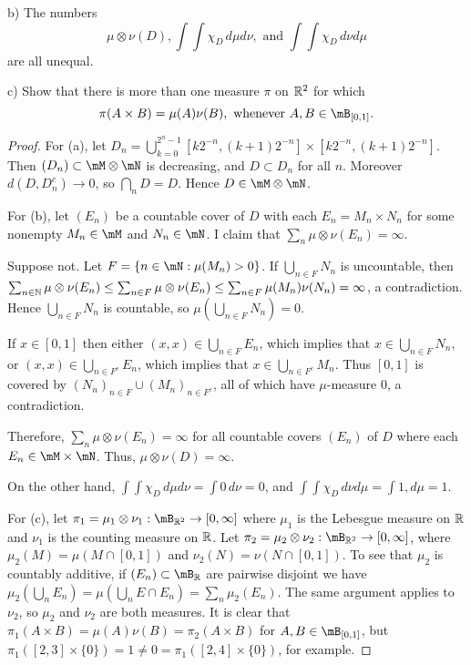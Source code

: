 \documentclass{article}
\begin{document}
b) The numbers 
$$\mu \otimes \nu (D), \int \int \chi_D \, d\mu d\nu, \text{ and } \int \int \chi_D \, d\nu d\mu$$
are all unequal.

c) Show that there is more than one measure $\pi$ on $\mathbb{R}^2$ for which
$$ \pi(A \times B) = \mu(A) \nu(B), \text{ whenever } A, B \in \mB_{[0,1]}.$$

\begin{proof}
For (a), let $D_n = \bigcup_{k=0}^{2^n-1} [k 2^{-n}, (k+1) 2^{-n}] \times [k 2^{-n}, (k+1) 2^{-n}]$.  Then $(D_n) \subset \mM \otimes \mN$ is decreasing, and $D \subset D_n$ for all $n$.  Moreover $d(D, D_n^c) \to 0$, so $\bigcap_n D = D$. Hence $D \in \mM \otimes \mN$.

For (b), let $(E_n)$ be a countable cover of $D$ with each $E_n = M_n \times N_n$ for some  nonempty $M_n \in \mM$ and $N_n \in \mN$.  I claim that $\sum_n \mu \otimes \nu(E_n) = \infty$. 

Suppose not. Let $F = \{ n \in \mN : \mu(M_n) > 0\}$. If $\bigcup_{n \in F} N_n$ is uncountable, then $\sum_{n \in \mathbb{N}} \mu \otimes \nu(E_n) \le \sum_{n \in F} \mu \otimes \nu(E_n) \le \sum_{n \in F} \mu(M_n) \nu(N_n) = \infty$, a contradiction. Hence $\bigcup_{n \in F} N_n$ is countable, so $\mu \left( \bigcup_{n \in F} N_n \right) = 0$.

If $x \in [0,1]$ then either $(x,x) \in \bigcup_{n \in F} E_n$, which implies that $x \in \bigcup_{n \in F} N_n$,  or $(x,x) \in \bigcup_{n \in F^c} E_n$, which implies that $x \in \bigcup_{n \in F^c} M_n$.  Thus $[0,1]$ is covered by $(N_n)_{n\in F} \cup (M_n)_{n \in F^c}$, all of which have $\mu$-measure $0$, a contradiction.

Therefore, $\sum_n \mu \otimes \nu(E_n) = \infty$ for all countable covers $(E_n)$ of $D$ where each $E_n \in \mM \times \mN$.  Thus, $\mu \otimes \nu(D) = \infty$.

On the other hand, $\int \int \chi_D  \, d \mu d\nu = \int 0 \, d \nu = 0$, and $\int \int \chi_D \, d \nu d \mu = \int 1 , d \mu  = 1$.

For (c), let $\pi_1 = \mu_1 \otimes \nu_1 :\mB_{\R^2} \to [0, \infty]$ where $\mu_1$ is the Lebesgue measure on $\mathbb{R}$ and $\nu_1$ is the counting measure on $\mathbb{R}$.  Let $\pi_2 = \mu_2 \otimes \nu_2:  \mB_{\R^2} \to [0, \infty]$, where $\mu_2(M) = \mu(M \cap [0,1])$ and $\nu_2(N) = \nu(N \cap [0,1])$. To see that $\mu_2$ is countably additive, if $(E_n) \subset \mB_\R$ are pairwise disjoint we have $\mu_2(\bigcup_n E_n) = \mu(\bigcup_n E \cap E_n) = \sum_n \mu_2(E_n)$.  The same argument applies to $\nu_2$, so $\mu_2$ and $\nu_2$ are both measures.   It is clear that $\pi_1(A \times B) = \mu(A) \nu(B) = \pi_2(A \times B)$ for $A,B \in \mB_{[0,1]}$, but $\pi_1([2,3] \times \{0\}) = 1 \neq 0 = \pi_1([2,4] \times \{0\})$, for example.
\end{proof}
\end{document}
